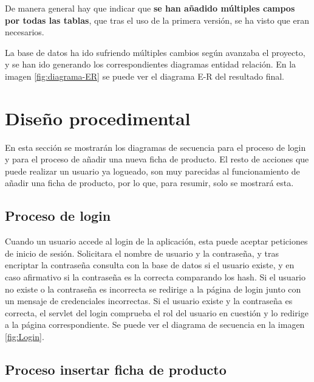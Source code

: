 De manera general hay que indicar que \textbf{se han añadido múltiples campos por todas las tablas}, que tras el uso de la primera versión, se ha visto que eran necesarios.

La base de datos ha ido sufriendo múltiples cambios según avanzaba el proyecto, y se han ido generando los correspondientes diagramas entidad relación. En la imagen \ref{fig:diagrama-ER} se puede ver el diagrama E-R del resultado final.


\section{Diseño procedimental}

En esta sección se mostrarán los diagramas de secuencia para el proceso de login y para el proceso de añadir una nueva ficha de producto. El resto de acciones que puede realizar un usuario ya logueado, son muy  parecidas al funcionamiento de añadir una ficha de producto, por lo que, para resumir, solo se mostrará esta. 

\subsection{Proceso de login}

Cuando un usuario accede al login de la aplicación, esta puede aceptar peticiones de inicio de sesión. Solicitara el nombre de usuario y la contraseña, y tras encriptar la contraseña consulta con la base de datos si el usuario existe, y en caso afirmativo si la contraseña es la correcta comparando los hash. Si el usuario no existe o la contraseña es incorrecta se redirige a la página de login junto con un mensaje de credenciales incorrectas. Si el usuario existe y la contraseña es correcta, el servlet del login comprueba el rol del usuario en cuestión y lo redirige a la página correspondiente. Se puede ver el diagrama  de secuencia en la imagen \ref{fig:Login}.



\subsection{Proceso insertar ficha de producto}

